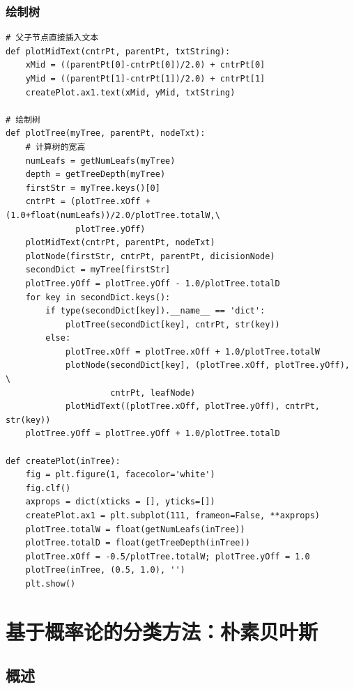 \documentclass[11pt]{ctexart}
\begin{document}
\subsubsection{绘制树}
\label{sec:orgheadline30}
\lstset{language=Python,label= ,caption= ,captionpos=b,numbers=none}
\begin{lstlisting}
# 父子节点直接插入文本
def plotMidText(cntrPt, parentPt, txtString):
    xMid = ((parentPt[0]-cntrPt[0])/2.0) + cntrPt[0]
    yMid = ((parentPt[1]-cntrPt[1])/2.0) + cntrPt[1]
    createPlot.ax1.text(xMid, yMid, txtString)

# 绘制树
def plotTree(myTree, parentPt, nodeTxt):
    # 计算树的宽高
    numLeafs = getNumLeafs(myTree)
    depth = getTreeDepth(myTree)
    firstStr = myTree.keys()[0]
    cntrPt = (plotTree.xOff + (1.0+float(numLeafs))/2.0/plotTree.totalW,\
              plotTree.yOff)
    plotMidText(cntrPt, parentPt, nodeTxt)
    plotNode(firstStr, cntrPt, parentPt, dicisionNode)
    secondDict = myTree[firstStr]
    plotTree.yOff = plotTree.yOff - 1.0/plotTree.totalD
    for key in secondDict.keys():
        if type(secondDict[key]).__name__ == 'dict':
            plotTree(secondDict[key], cntrPt, str(key))
        else:
            plotTree.xOff = plotTree.xOff + 1.0/plotTree.totalW
            plotNode(secondDict[key], (plotTree.xOff, plotTree.yOff), \
                     cntrPt, leafNode)
            plotMidText((plotTree.xOff, plotTree.yOff), cntrPt, str(key))
    plotTree.yOff = plotTree.yOff + 1.0/plotTree.totalD

def createPlot(inTree):
    fig = plt.figure(1, facecolor='white')
    fig.clf()
    axprops = dict(xticks = [], yticks=[])
    createPlot.ax1 = plt.subplot(111, frameon=False, **axprops)
    plotTree.totalW = float(getNumLeafs(inTree))
    plotTree.totalD = float(getTreeDepth(inTree))
    plotTree.xOff = -0.5/plotTree.totalW; plotTree.yOff = 1.0
    plotTree(inTree, (0.5, 1.0), '')
    plt.show()
\end{lstlisting}
\section{基于概率论的分类方法：朴素贝叶斯}
\label{sec:orgheadline46}
\subsection{概述}
\label{sec:orgheadline38}
\end{document}

